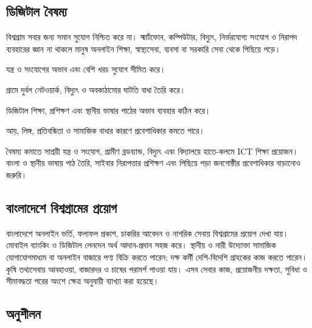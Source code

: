 \begin{topicbody}
\subsection{ডিজিটাল বৈষম্য}
\label{sec:ch1-digital-divide}
বিশ্বগ্রাম সবার জন্য সমান সুযোগ নিশ্চিত করে না। স্মার্টফোন, কম্পিউটার, বিদ্যুৎ, নির্ভরযোগ্য সংযোগ ও নিরাপদ ব্যবহারের জ্ঞান না থাকলে মানুষ অনলাইন শিক্ষা, স্বাস্থ্যসেবা, ব্যবসা বা সরকারি সেবা থেকে পিছিয়ে পড়ে।
\begin{compactpoints}
\item যন্ত্র ও সংযোগের অভাব এবং বেশি খরচ সুযোগ সীমিত করে।
\item গ্রামে দুর্বল নেটওয়ার্ক, বিদ্যুৎ ও অবকাঠামোর ঘাটতি বাধা তৈরি করে।
\item ডিজিটাল শিক্ষা, প্রশিক্ষণ এবং স্থানীয় ভাষার পাঠের অভাব ব্যবহার কঠিন করে।
\item আয়, লিঙ্গ, প্রতিবন্ধিতা ও সামাজিক বাধার কারণে প্রবেশাধিকার কমতে পারে।
\end{compactpoints}
বৈষম্য কমাতে সাশ্রয়ী যন্ত্র ও সংযোগ, গ্রামীণ ব্রডব্যান্ড, বিদ্যুৎ এবং বিদ্যালয়ে হাতে-কলমে ICT শিক্ষা প্রয়োজন। বাংলা ও স্থানীয় ভাষায় পাঠ তৈরি, সাইবার নিরাপত্তার প্রশিক্ষণ এবং পিছিয়ে পড়া জনগোষ্ঠীর প্রবেশাধিকার বাড়ানোও জরুরি।


\subsection{বাংলাদেশে বিশ্বগ্রামের প্রয়োগ}
বাংলাদেশে অনলাইন ভর্তি, ফলাফল প্রকাশ, চাকরির আবেদন ও নাগরিক সেবায় বিশ্বগ্রামের প্রয়োগ দেখা যায়। মোবাইল ব্যাংকিং ও ডিজিটাল লেনদেন অর্থ আদান-প্রদান সহজ করে। স্থানীয় ও নারী উদ্যোক্তা সামাজিক যোগাযোগমাধ্যম বা অনলাইন বাজারে পণ্য বিক্রি করতে পারেন; দক্ষ কর্মী দেশি-বিদেশি গ্রাহকের কাজ করতে পারেন। কৃষি তথ্যসেবায় আবহাওয়া, বাজারদর ও চাষের পরামর্শ পাওয়া যায়। এসব সেবার কাজ, প্রয়োজনীয় দক্ষতা, সুবিধা ও সীমাবদ্ধতা পরের অংশে ক্ষেত্র অনুযায়ী ব্যাখ্যা করা হয়েছে।

\subsection{অনুশীলন}


\end{topicbody}

